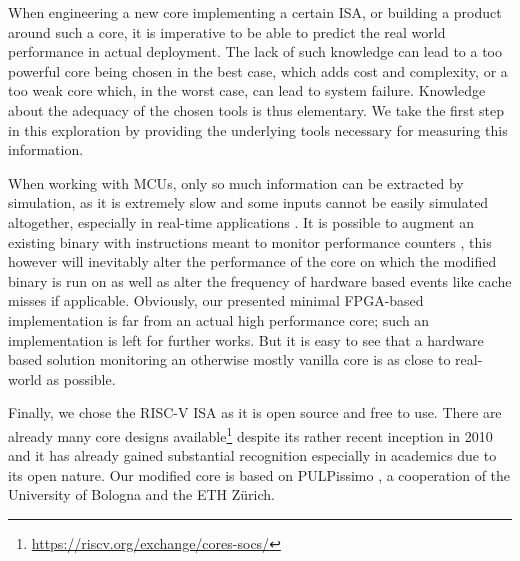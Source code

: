 \documentclass[../bachelor_paper.tex]{subfiles}
\begin{document}
When engineering a new core implementing a certain \ac{ISA}, or building a product around such a core, it is imperative to be able to predict the real world performance in actual deployment. The lack of such knowledge can lead to a too powerful core being chosen in the best case, which adds cost and complexity, or a too weak core which, in the worst case, can lead to system failure. Knowledge about the adequacy of the chosen tools is thus elementary. We take the first step in this exploration by providing the underlying tools necessary for measuring this information.

When working with \ac{MCU}s, only so much information can be extracted by simulation, as it is extremely slow \cite{eeckhoutDesigningComputerArchitecture2003,kaoHardwareApproachRealTime2007} and some inputs cannot be easily simulated altogether, especially in real-time applications \cite{kaoHardwareApproachRealTime2007}. It is possible to augment an existing binary with instructions meant to monitor performance counters \cite{eeckhoutQuantifyingImpactInput}, this however will inevitably alter the performance of the core on which the modified binary is run on as well as alter the frequency of hardware based events like cache misses if applicable. Obviously, our presented minimal FPGA-based implementation is far from an actual high performance core; such an implementation is left for further works. But it is easy to see that a hardware based solution monitoring an otherwise mostly vanilla core is as close to real-world as possible.

Finally, we chose the RISC-V ISA \cite{RISCVTechnicalSpecification} as it is open source and free to use. There are already many core designs available\footnote{\url{https://riscv.org/exchange/cores-socs/}} despite its rather recent inception in 2010 and it has already gained substantial recognition especially in academics due to its open nature. Our modified core is based on PULPissimo \cite{GitHubPulpplatformPulpissimo2021}, a cooperation of the University of Bologna and the ETH Z\"urich.
\end{document}
